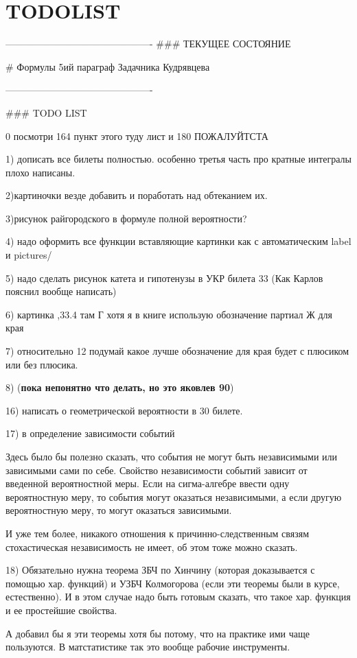 \chapter{TODOLIST}
----------------------------------------------
### ТЕКУЩЕЕ СОСТОЯНИЕ

# Формулы
5ий параграф Задачника Кудрявцева

----------------------------------------------

### TODO LIST

0 посмотри 164 пункт этого туду лист и 180 ПОЖАЛУЙТСТА

1) дописать все билеты полностью. особенно третья часть про кратные интегралы плохо написаны.

2)картиночки везде добавить и поработать над обтеканием их.
 
3)рисунок райгородского в формуле полной вероятности? 
 
4) надо оформить все функции вставляющие картинки как \usepict с автоматическим label и pictures/
 
5) надо сделать рисунок катета и гипотенузы в УКР билета 33
(Как Карлов пояснил вообще написать)
 
6) картинка ,33.4 там Г хотя я в книге использую обозначение партиал Ж для края

7) относительно 12 подумай какое лучше обозначение для края будет с плюсиком или без плюсика. 

8) (\textbf{пока непонятно что делать, но это яковлев 90})

16) написать о геометрической вероятности в 30 билете.

17) в определение зависимости событий

Здесь было бы полезно сказать, что события не могут быть независимыми или зависимыми сами по себе. Свойство независимости событий зависит от введенной вероятностной меры. Если на сигма-алгебре ввести одну вероятностную меру, то события могут оказаться независимыми, а если другую вероятностную меру, то могут оказаться зависимыми.

И уже тем более, никакого отношения к причинно-следственным связям стохастическая независимость не имеет, об этом тоже можно сказать.

18) Обязательно нужна теорема ЗБЧ по Хинчину (которая доказывается с помощью хар. функций) и УЗБЧ Колмогорова (если эти теоремы были в курсе, естественно). И в этом случае надо быть готовым сказать, что такое хар. функция и ее простейшие свойства.

А добавил бы я эти теоремы хотя бы потому, что на практике ими чаще  пользуются. В матстатистике так это вообще рабочие инструменты.

